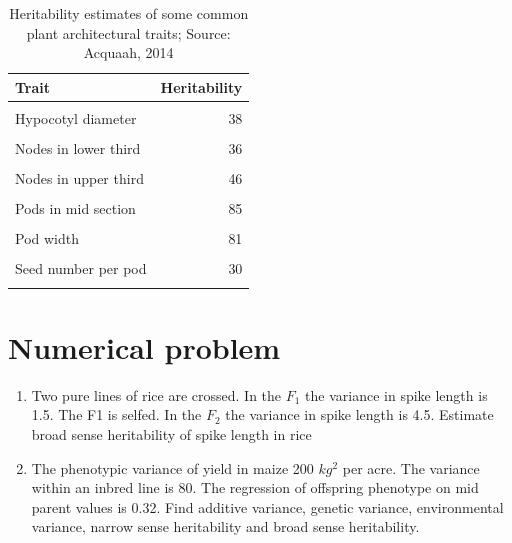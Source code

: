 \documentclass[11pt,ignorenonframetext,aspectratio=169]{beamer}
\begin{document}
\begin{frame}{}
\protect\hypertarget{section-13}{}
\begin{table}

\caption{\label{tab:heritability-estimates}Heritability estimates of some common plant architectural traits; Source: Acquaah, 2014}
\centering
\begin{tabular}[t]{lr}
\toprule
Trait & Heritability\\
\midrule
\cellcolor{gray!6}{Plant height} & \cellcolor{gray!6}{45}\\
Hypocotyl diameter & 38\\
\cellcolor{gray!6}{Number of branches/plant} & \cellcolor{gray!6}{56}\\
Nodes in lower third & 36\\
\cellcolor{gray!6}{Nodes in mid section} & \cellcolor{gray!6}{45}\\
\addlinespace
Nodes in upper third & 46\\
\cellcolor{gray!6}{Pods in lower third} & \cellcolor{gray!6}{62}\\
Pods in mid section & 85\\
\cellcolor{gray!6}{Pods in upper third} & \cellcolor{gray!6}{80}\\
Pod width & 81\\
\addlinespace
\cellcolor{gray!6}{Pod length} & \cellcolor{gray!6}{67}\\
Seed number per pod & 30\\
\cellcolor{gray!6}{100 seed weight} & \cellcolor{gray!6}{77}\\
\bottomrule
\end{tabular}
\end{table}
\end{frame}

\hypertarget{numerical-problem-1}{%
\section{Numerical problem}\label{numerical-problem-1}}

\begin{frame}{}
\protect\hypertarget{section-14}{}
\begin{enumerate}
\item
  Two pure lines of rice are crossed. In the \(F_1\) the variance in
  spike length is 1.5. The F1 is selfed. In the \(F_2\) the variance in
  spike length is 4.5. Estimate broad sense heritability of spike length
  in rice
\item
  The phenotypic variance of yield in maize 200 \(kg^2\) per acre. The
  variance within an inbred line is 80. The regression of offspring
  phenotype on mid parent values is 0.32. Find additive variance,
  genetic variance, environmental variance, narrow sense heritability
  and broad sense heritability.
\end{enumerate}
\end{frame}
\end{document}
